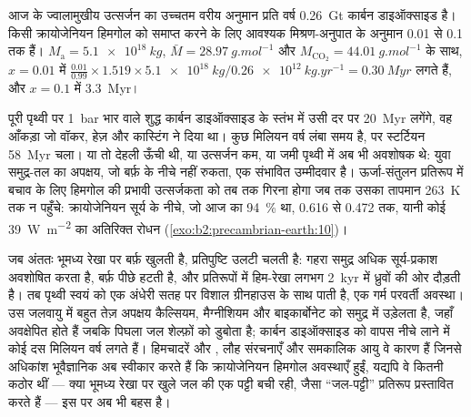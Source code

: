 \begin{example}\label{ex:b2:precambrian-earth:escape}
आज के ज्वालामुखीय उत्सर्जन का उच्चतम वरीय अनुमान प्रति वर्ष \qty{0.26}{Gt} कार्बन
डाइऑक्साइड है। किसी क्रायोजेनियन हिमगोल को समाप्त करने के लिए आवश्यक
मिश्रण-अनुपात के अनुमान 0.01 से 0.1 तक हैं। $M_{\text{a}} =
\qty{5.1e18}{kg}$, $\bar M = \qty{28.97}{g.mol^{-1}}$ और $M_{\mathrm{CO_2}} =
\qty{44.01}{g.mol^{-1}}$ के साथ, $x = 0.01$ में $\frac{0.01}{0.99}\times1.519\times\qty{5.1e18}{kg}
/ \qty{0.26e12}{kg.yr^{-1}} = \qty{0.30}{Myr}$ लगते हैं, और $x = 0.1$ में \qty{3.3}{Myr}।
\end{example}

पूरी पृथ्वी पर \qty{1}{bar} भार वाले शुद्ध कार्बन डाइऑक्साइड के स्तंभ में उसी दर पर
\qty{20}{Myr} लगेंगे, वह आँकड़ा जो वॉकर, हेज़ और कास्टिंग ने दिया था। कुछ मिलियन वर्ष
लंबा समय है, पर स्टर्टियन \qty{58}{Myr} चला। या तो देहली ऊँची थी, या
उत्सर्जन कम, या जमी पृथ्वी में अब भी अवशोषक थे: युवा समुद्र-तल का अपक्षय,
जो बर्फ़ के नीचे नहीं रुकता, एक संभावित उम्मीदवार है। ऊर्जा-संतुलन प्रतिरूप में बचाव के लिए
हिमगोल की प्रभावी उत्सर्जकता को तब तक गिरना होगा जब तक उसका तापमान \qty{263}{K} तक न पहुँचे:
क्रायोजेनियन सूर्य के नीचे, जो आज का \qty{94}{\percent} था, 0.616 से 0.472 तक, यानी
कोई \qty{39}{W.m^{-2}} का अतिरिक्त रोधन (\cref{exo:b2:precambrian-earth:10})।

जब अंततः भूमध्य रेखा पर बर्फ़ खुलती है, प्रतिपुष्टि उलटी चलती है: गहरा समुद्र अधिक
सूर्य-प्रकाश अवशोषित करता है, बर्फ़ पीछे हटती है, और प्रतिरूपों में हिम-रेखा लगभग
\qty{2}{kyr} में ध्रुवों की ओर दौड़ती है। तब पृथ्वी स्वयं को एक अंधेरी सतह पर विशाल ग्रीनहाउस के साथ पाती है, एक गर्म
परवर्ती अवस्था। उस जलवायु में बहुत तेज़ अपक्षय कैल्सियम, मैग्नीशियम और बाइकार्बोनेट को
समुद्र में उड़ेलता है, जहाँ  अवक्षेपित होते हैं जबकि पिघला जल शेल्फ़ों को डुबोता है; कार्बन डाइऑक्साइड को
वापस नीचे लाने में कोई दस मिलियन वर्ष लगते हैं। हिमचादरें और , लौह संरचनाएँ और समकालिक आयु वे कारण हैं जिनसे अधिकांश भूवैज्ञानिक अब स्वीकार करते हैं
कि क्रायोजेनियन हिमगोल अवस्थाएँ हुईं, यद्यपि वे कितनी कठोर थीं --- क्या भूमध्य रेखा पर खुले
जल की एक पट्टी बची रही, जैसा ``जल-पट्टी'' प्रतिरूप प्रस्तावित करते हैं --- इस पर अब भी बहस है।

